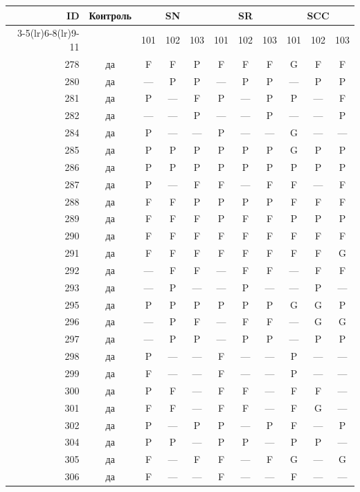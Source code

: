\begin{table}[p]\centering\small
\begin{tabular*}{\textwidth}{@{\extracolsep{\fill}}rc*{9}{c}@{}}\toprule
ID & Контроль & \multicolumn{3}{c}{SN} & \multicolumn{3}{c}{SR} & \multicolumn{3}{c}{SCC}\\
\cmidrule(lr){3-5}\cmidrule(lr){6-8}\cmidrule(lr){9-11}
 & & 101 & 102 & 103 & 101 & 102 & 103 & 101 & 102 & 103\\\midrule
278 & да & F & F & P & F & F & F & G & F & F\\
280 & да & — & P & P & — & P & P & — & P & P\\
281 & да & P & — & F & P & — & P & P & — & F\\
282 & да & — & — & P & — & — & P & — & — & P\\
284 & да & P & — & — & P & — & — & G & — & —\\
285 & да & P & P & P & P & P & P & G & P & P\\
286 & да & P & P & P & P & P & P & P & P & P\\
287 & да & P & — & F & F & — & F & F & — & F\\
288 & да & F & F & P & P & P & P & F & F & F\\
289 & да & F & F & F & P & F & F & P & P & P\\
290 & да & F & F & F & F & F & F & F & F & F\\
291 & да & F & F & F & F & F & F & F & F & G\\
292 & да & — & F & F & — & F & F & — & F & F\\
293 & да & — & P & — & — & P & — & — & P & —\\
295 & да & P & P & P & P & P & P & G & G & P\\
296 & да & — & P & F & — & F & F & — & G & G\\
297 & да & — & P & P & — & P & P & — & P & P\\
298 & да & P & — & — & F & — & — & P & — & —\\
299 & да & F & — & — & F & — & — & P & — & —\\
300 & да & P & F & — & F & F & — & F & F & —\\
301 & да & F & F & — & F & F & — & F & G & —\\
302 & да & P & — & P & P & — & P & F & — & P\\
304 & да & P & P & — & P & P & — & P & P & —\\
305 & да & F & — & F & F & — & F & G & — & G\\
306 & да & F & — & — & F & — & — & F & — & —\\

\end{tabular*}
\end{table}
